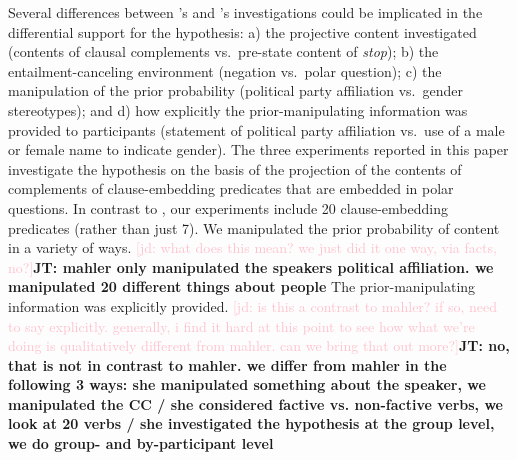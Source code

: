 \documentclass[11pt,fleqn]{article}
\newcommand{\jd}[1]{\textcolor{Pink}{[jd: #1]}}
\newcommand{\jt}[1]{\textbf{\color{blue}JT: #1}}
\newcommand{\6}{\mbox{$[\hspace*{-.6mm}[$}}
\newcommand{\9}{\mbox{$]\hspace*{-.6mm}]$}}
\newcommand{\citeposs}[1]{\citeauthor{#1}'s}
\begin{document}
Several differences between \citeposs{mahler2020} and \citeposs{lorson2018} investigations could be implicated in the differential support for the hypothesis: a) the projective content investigated (contents of clausal complements vs.\ pre-state content of {\em stop}); b) the entailment-canceling environment (negation vs.\ polar question); c) the manipulation of the prior probability (political party affiliation vs.\ gender stereotypes); and d) how explicitly the prior-manipulating information was provided to participants (statement of political party affiliation vs.\  use of a male or female name to indicate gender). The three experiments reported in this paper investigate the hypothesis on the basis of the projection of the contents of complements of clause-embedding predicates that are embedded in polar questions. In contrast to , our experiments include 20 clause-embedding predicates (rather than just 7). %
We manipulated the prior probability of content in a variety of ways. \jd{what does this mean? we just did it one way, via facts, no?}\jt{mahler only manipulated the speakers political affiliation. we manipulated 20 different things about people} The prior-manipulating information was explicitly provided. \jd{is this a contrast to mahler? if so, need to say explicitly. generally, i find it hard at this point to see how what we're doing is qualitatively different from mahler. can we bring that out more?}\jt{no, that is not in contrast to mahler. we differ from mahler in the following 3 ways: she manipulated something about the speaker, we manipulated the CC / she considered factive vs. non-factive verbs, we look at 20 verbs / she investigated the hypothesis at the group level, we do group- and by-participant level}
\end{document}
